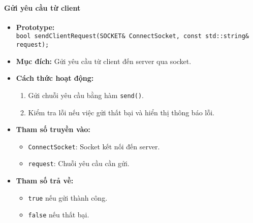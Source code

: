 \paragraph{\textbf{Gửi yêu cầu từ client}}
\begin{itemize}
    \item \textbf{Prototype:}\\ \texttt{bool sendClientRequest(SOCKET\& ConnectSocket, const std::string\& request);}
    
    \item \textbf{Mục đích:} Gửi yêu cầu từ client đến server qua socket.
    
    \item \textbf{Cách thức hoạt động:} 
    \begin{enumerate}
        \item Gửi chuỗi yêu cầu bằng hàm \texttt{send()}.
        \item Kiểm tra lỗi nếu việc gửi thất bại và hiển thị thông báo lỗi.
    \end{enumerate}
    
    \item \textbf{Tham số truyền vào:} 
    \begin{itemize}
        \item \texttt{ConnectSocket}: Socket kết nối đến server.
        \item \texttt{request}: Chuỗi yêu cầu cần gửi.
    \end{itemize}
    
    \item \textbf{Tham số trả về:} 
    \begin{itemize}
        \item \texttt{true} nếu gửi thành công.
        \item \texttt{false} nếu thất bại.
    \end{itemize}
\end{itemize}

